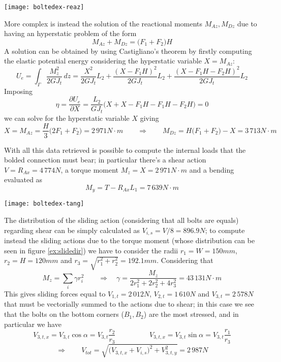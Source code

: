 	\begin{SCfigure}[1][bht]
		\centering \texttt{[image: boltedex-reaz]}
		\caption{free body diagram of the problem.} \label{ex:stirfbd}
	\end{SCfigure}
	
	\noindent
	More complex is instead the solution of the reactional moments $M_{Az},M_{Dz}$ due to having an hyperstatic problem of the form
	\[ M_{Az} + M_{Dz} = \big(F_1 + F_2\big)H \]
	A solution can be obtained by using Castigliano's theorem by firstly computing the elastic potential energy considering the hyperstatic variable $X= M_{Az}$:
	\[ U_e = \int_\Gamma \frac{M_z^2}{2GJ_t} \, dz = \frac{X^2}{2GJ_t} L_2 + \frac{(X - F_1H)^2}{2GJ_t}L_2 + \frac{(X-F_1H-F_2H)^2}{2GJ_t}L_2 \]
	Imposing 
	\[ \eta = \frac{\partial U_e}{\partial X} = \frac{L_2}{GJ_t} \big(X + X - F_1 H - F_1H-F_2H\big) = 0 \]
	we can solve for the hyperstatic variable $X$ giving
	\[ X = M_{Az} = \frac H 3 \big(2F_1 + F_2\big) = 2\,971 N\cdot m \qquad \Rightarrow \qquad M_{Dz} = H \big(F_1+F_2\big) - X = 3\,713 N \cdot m  \]
	
	With all this data retrieved is possible to compute the internal loads that the bolded connection must bear; in particular there's a shear action $V = R_{Ax} = 4\,774N$, a torque moment $M_z = X = 2\,971 N\cdot m$ and a bending evaluated as
	\[ M_y = T - R_{Ax} L_1  = 7\,639 N\cdot m \]
	\begin{SCfigure}[1.3][b]
		\centering \texttt{[image: boltedex-tang]}
		\caption{schematic representation of the sliding actions due to shear and torque. }
		\label{ex:slidedir}
	\end{SCfigure}
	The distribution of the sliding action (considering that all bolts are equals) regarding shear can be simply calculated as $V_{i,s} = V/8 = 896.9N$; to compute instead the sliding actions due to the torque moment (whose distribution can be seen in figure \ref{ex:slidedir}) we have to consider the radii $r_1 = W = 150mm$, $r_2 = H = 120mm$ and $r_3 = \sqrt{r_1^2 + r_2^2} = 192.1mm$. Considering that
	\[ M_z = \sum_i \gamma r_i^2 \qquad \Rightarrow \quad \gamma = \frac{M_z}{2r_1^2 + 2r_2^2 + 4r_3^2} = 43\,131 N\cdot m \]
	This gives sliding forces equal to $V_{1,t} = 2\,012N$, $V_{2,t} = 1\,610 N$ and $V_{3,t} = 2\,578N$ that must be vectorially summed to the actions due to shear; in this case we see that the bolts on the bottom corners ($B_1,B_2$) are the most stressed, and in particular we have
	\[ V_{3,t,x} = V_{3,t} \cos\alpha = V_{3,t} \frac{r_2}{r_3} \hspace{2cm}  V_{3,t,x} = V_{3,t} \sin\alpha = V_{3,t} \frac{r_1}{r_3}  \]
	\[ \Rightarrow \qquad V_{tot} = \sqrt{ \big(V_{3,t,x} + V_{i,s}\big)^2 + V_{3,t,y}^2 } = 2\,987 N \]
	
